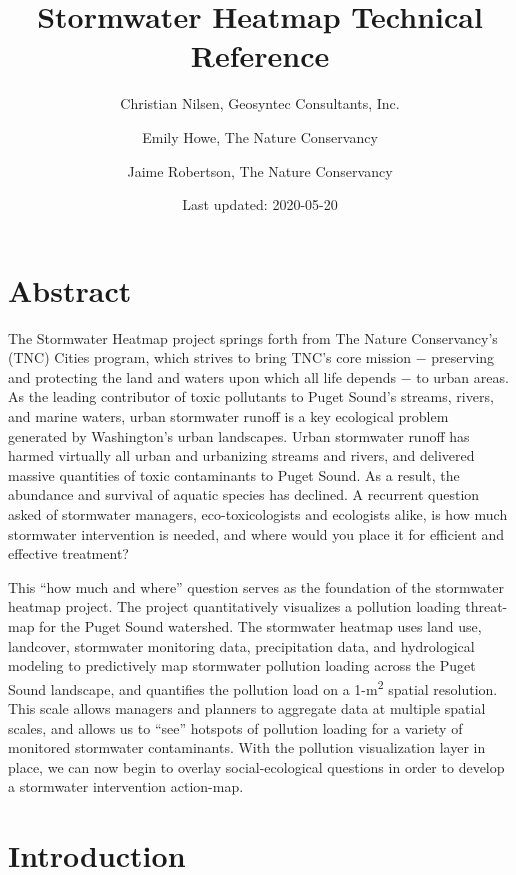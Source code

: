\documentclass[
]{report}
\title{Stormwater Heatmap Technical Reference}
\author{Christian Nilsen, Geosyntec Consultants, Inc. \and Emily Howe, The Nature Conservancy \and Jaime Robertson, The Nature Conservancy}
\date{Last updated: 2020-05-20}
\begin{document}
\maketitle

{
\setcounter{tocdepth}{1}
\tableofcontents
}
\hypertarget{abstract}{%
\chapter*{Abstract}\label{abstract}}

The Stormwater Heatmap project springs forth from The Nature Conservancy's (TNC) Cities program, which strives to bring TNC's core mission − preserving and protecting the land and waters upon which all life depends − to urban areas. As the leading contributor of toxic pollutants to Puget Sound's streams, rivers, and marine waters, urban stormwater runoff is a key ecological problem generated by Washington's urban landscapes. Urban stormwater runoff has harmed virtually all urban and urbanizing streams and rivers, and delivered massive quantities of toxic contaminants to Puget Sound. As a result, the abundance and survival of aquatic species has declined. A recurrent question asked of stormwater managers, eco-toxicologists and ecologists alike, is how much stormwater intervention is needed, and where would you place it for efficient and effective treatment?

This ``how much and where'' question serves as the foundation of the stormwater heatmap project. The project quantitatively visualizes a pollution loading threat-map for the Puget Sound watershed. The stormwater heatmap uses land use, landcover, stormwater monitoring data, precipitation data, and hydrological modeling to predictively map stormwater pollution loading across the Puget Sound landscape, and quantifies the pollution load on a 1-m\textsuperscript{2} spatial resolution. This scale allows managers and planners to aggregate data at multiple spatial scales, and allows us to ``see'' hotspots of pollution loading for a variety of monitored stormwater contaminants. With the pollution visualization layer in place, we can now begin to overlay social-ecological questions in order to develop a stormwater intervention action-map.

\hypertarget{introduction}{%
\chapter{Introduction}\label{introduction}}
\end{document}
